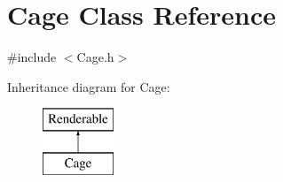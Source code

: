 \hypertarget{classCage}{\section{Cage Class Reference}
\label{classCage}
}


{\ttfamily \#include $<$Cage.\+h$>$}

Inheritance diagram for Cage\+:\begin{figure}[H]
\begin{center}
\leavevmode
\includegraphics[height=2.000000cm]{classCage}
\end{center}
\end{figure}
